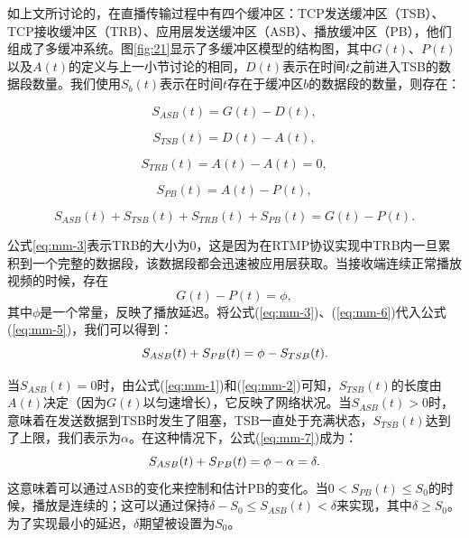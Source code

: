 如上文所讨论的，在直播传输过程中有四个缓冲区：TCP发送缓冲区（TSB）、TCP接收缓冲区（TRB）、应用层发送缓冲区（ASB）、播放缓冲区（PB），他们组成了多缓冲系统。图\ref{fig:21}显示了多缓冲区模型的结构图，其中$G(t)$、$P(t)$以及$A(t)$的定义与上一小节讨论的相同，$D(t)$表示在时间$t$之前进入TSB的数据段数量。我们使用$S_b(t)$表示在时间$t$存在于缓冲区$b$的数据段的数量，则存在：

\begin{equation}
\label{eq:mm-1}
S_{ASB}(t)=G(t)-D(t),
\end{equation}

\begin{equation}
\label{eq:mm-2}
S_{TSB}(t)=D(t)-A(t),
\end{equation}

\begin{equation}
\label{eq:mm-3}
S_{TRB}(t)=A(t)-A(t)=0,
\end{equation}

\begin{equation}
\label{eq:mm-4}
S_{PB}(t) =A(t)-P(t),
\end{equation}

\begin{equation}
\label{eq:mm-5}
S_{ASB}(t)+S_{TSB}(t)+S_{TRB}(t)+S_{PB}(t)=G(t)-P(t).
\end{equation}
\vspace{10pt}

公式\ref{eq:mm-3}表示TRB的大小为0，这是因为在RTMP协议实现中TRB内一旦累积到一个完整的数据段，该数据段都会迅速被应用层获取。当接收端连续正常播放视频的时候，存在
\begin{equation}
\label{eq:mm-6}
G(t)-P(t)=\phi,
\end{equation}
其中$\phi$是一个常量，反映了播放延迟。将公式(\ref{eq:mm-3})、(\ref{eq:mm-6})代入公式(\ref{eq:mm-5})，我们可以得到：
\vspace{10pt}
\begin{equation}
\vspace{10pt}
\label{eq:mm-7}
S_{ASB}(t)+S_{PB}(t)=\phi-S_{TSB}(t).
\end{equation}

当$S_{ASB}(t)=0$时，由公式(\ref{eq:mm-1})和(\ref{eq:mm-2})可知，$S_{TSB}(t)$的长度由$A(t)$决定（因为$G(t)$以匀速增长），它反映了网络状况。当$S_{ASB}(t)>0$时，意味着在发送数据到TSB时发生了阻塞，TSB一直处于充满状态，$S_{TSB}(t)$达到了上限，我们表示为$\alpha$。在这种情况下，公式(\ref{eq:mm-7})成为：
\vspace{10pt}
\begin{equation}
\vspace{10pt}
\label{eq:mm-8}
S_{ASB}(t)+S_{PB}(t)=\phi-\alpha=\delta.
\end{equation}
这意味着可以通过ASB的变化来控制和估计PB的变化。当$0 < S_{PB}(t) \le S_0$的时候，播放是连续的；这可以通过保持$\delta - S_0 \le S_{ASB}(t) < \delta$来实现，其中$\delta \ge S_0$。为了实现最小的延迟，$\delta$期望被设置为$S_0$。

